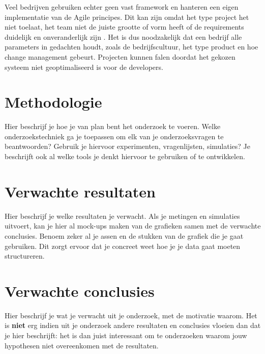 Veel bedrijven gebruiken echter geen vast framework en hanteren een eigen implementatie van de Agile principes. Dit kan zijn omdat het type project het niet toelaat, het team niet de juiste grootte of vorm heeft of de requirements duidelijk en onveranderlijk zijn \autocite{Naekki2011}. Het is dus noodzakelijk dat een bedrijf alle parameters in gedachten houdt, zoals de bedrijfscultuur, het type product en hoe change management gebeurt. Projecten kunnen falen doordat het gekozen systeem niet geoptimaliseerd is voor de developers.


\section{Methodologie}
\label{sec:methodologie}

Hier beschrijf je hoe je van plan bent het onderzoek te voeren. Welke onderzoekstechniek ga je toepassen om elk van je onderzoeksvragen te beantwoorden? Gebruik je hiervoor experimenten, vragenlijsten, simulaties? Je beschrijft ook al welke tools je denkt hiervoor te gebruiken of te ontwikkelen.

\section{Verwachte resultaten}
\label{sec:verwachte_resultaten}

Hier beschrijf je welke resultaten je verwacht. Als je metingen en simulaties uitvoert, kan je hier al mock-ups maken van de grafieken samen met de verwachte conclusies. Benoem zeker al je assen en de stukken van de grafiek die je gaat gebruiken. Dit zorgt ervoor dat je concreet weet hoe je je data gaat moeten structureren.

\section{Verwachte conclusies}
\label{sec:verwachte_conclusies}

Hier beschrijf je wat je verwacht uit je onderzoek, met de motivatie waarom. Het is \textbf{niet} erg indien uit je onderzoek andere resultaten en conclusies vloeien dan dat je hier beschrijft: het is dan juist interessant om te onderzoeken waarom jouw hypothesen niet overeenkomen met de resultaten.

